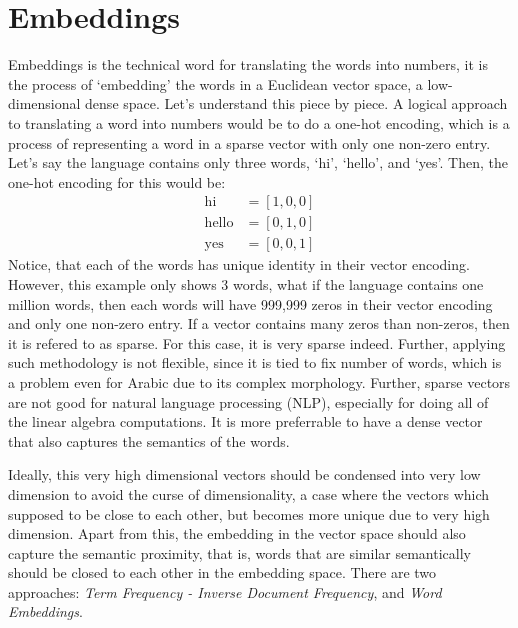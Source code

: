 \section{Embeddings}
Embeddings is the technical word for translating the words into numbers, it is the process of `embedding' the words in a Euclidean vector space, a low-dimensional dense space. Let's understand this piece by piece. A logical approach to translating a word into numbers would be to do a one-hot encoding, which is a process of representing a word in a sparse vector with only one non-zero entry. Let's say the language contains only three words, `hi', `hello', and `yes'. Then, the one-hot encoding for this would be:
\begin{align}
    \text{hi}&=[1,0,0]\\
    \text{hello}&=[0,1,0]\\
    \text{yes}&=[0,0,1]
\end{align}
Notice, that each of the words has unique identity in their vector encoding. However, this example only shows 3 words, what if the language contains one million words, then each words will have 999,999 zeros in their vector encoding and only one non-zero entry. If a vector contains many zeros than non-zeros, then it is refered to as sparse. For this case, it is very sparse indeed. Further, applying such methodology is not flexible, since it is tied to fix number of words, which is a problem even for Arabic due to its complex morphology. Further, sparse vectors are not good for natural language processing (NLP), especially for doing all of the linear algebra computations. It is more preferrable to have a dense vector that also captures the semantics of the words.

Ideally, this very high dimensional vectors should be condensed into very low dimension to avoid the curse of dimensionality, a case where the vectors which supposed to be close to each other, but becomes more unique due to very high dimension. Apart from this, the embedding in the vector space should also capture the semantic proximity, that is, words that are similar semantically should be closed to each other in the embedding space. There are two approaches: \textit{Term Frequency - Inverse Document Frequency}, and \textit{Word Embeddings}.
